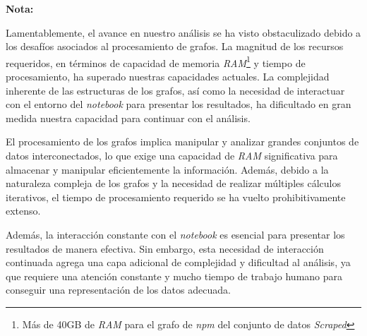 \textbf{Nota:} 

Lamentablemente, el avance en nuestro análisis se ha visto obstaculizado debido a los desafíos asociados 
al procesamiento de grafos. La magnitud de los recursos requeridos, en términos de capacidad de memoria \textit{RAM}\footnote{Más de 40GB de \textit{RAM} para el grafo de \textit{npm} del conjunto de datos \textit{Scraped}}
y tiempo de procesamiento, ha superado nuestras capacidades actuales. La complejidad inherente de las estructuras de 
los grafos, así como la necesidad de interactuar con el entorno del \textit{notebook} para presentar los resultados, 
ha dificultado en gran medida nuestra capacidad para continuar con el análisis.

El procesamiento de los grafos implica manipular y analizar grandes conjuntos de datos interconectados, lo que exige 
una capacidad de \textit{RAM} significativa para almacenar y manipular eficientemente la información. Además, debido 
a la naturaleza compleja de los grafos y la necesidad de realizar múltiples cálculos iterativos, el tiempo de 
procesamiento requerido se ha vuelto prohibitivamente extenso.

Además, la interacción constante con el \textit{notebook} es esencial para presentar los resultados de manera efectiva. 
Sin embargo, esta necesidad de interacción continuada agrega una capa adicional de complejidad y dificultad al análisis, 
ya que requiere una atención constante y mucho tiempo de trabajo humano para conseguir una representación de los datos adecuada.